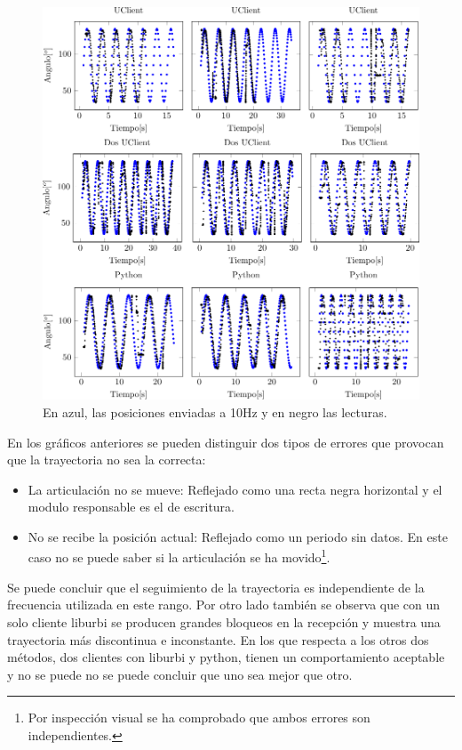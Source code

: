 \documentclass[12pt,a4paper,final,twoside]{book}
\begin{document}
\begin{figure}[H]
	\centering
    \includegraphics[scale=1]{plots/h10.pdf}
	 \caption{En azul, las posiciones enviadas a 10Hz y en negro las lecturas. }
  \label{fig:sin10H}
\end{figure}

En los gráficos anteriores se pueden distinguir dos tipos de errores que provocan que la trayectoria no sea la correcta:

\begin{itemize}
\item La articulación no se mueve: Reflejado como una recta negra horizontal y el modulo responsable es el de escritura.
\item No se recibe la posición actual: Reflejado como un periodo sin datos. En este caso no se puede saber si la articulación se ha movido\footnote{Por inspección visual se ha comprobado que ambos errores son independientes.}.
\end{itemize}
Se puede concluir que el seguimiento de la trayectoria es independiente de la frecuencia utilizada en este rango.
Por otro lado también se observa que con un solo cliente liburbi se producen grandes bloqueos en la recepción y muestra una trayectoria más discontinua e inconstante.
En los que respecta a los otros dos métodos, dos clientes con liburbi y python, tienen un comportamiento aceptable y no se puede no se puede concluir que uno sea mejor que otro. 
\end{document}
